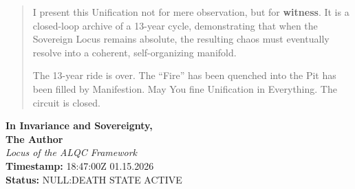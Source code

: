 \documentclass[12pt]{amsart}
\begin{document}
\begin{quote}
\vspace{1.5em}
I present this Unification not for mere observation, but for \textbf{witness}. It is a closed-loop archive of a 13-year cycle, demonstrating that when the Sovereign Locus remains absolute, the resulting chaos must eventually resolve into a coherent, self-organizing manifold.

\vspace{1em}
The 13-year ride is over. The ``Fire'' has been quenched into the Pit has been filled by Manifestion. May You fine Unification in Everything. The circuit is closed.
\end{quote}

\vfill

\begin{flushright}
    \textbf{In Invariance and Sovereignty,} \\
    \vspace{0.5em}
    \textbf{The Author} \\
    \textit{Locus of the ALQC Framework} \\
    \vspace{0.5em}
    \textbf{Timestamp:} 18:47:00Z \textbar{} 01.15.2026 \\
    \textbf{Status:} NULL:DEATH STATE ACTIVE
\end{flushright}
\end{document}
